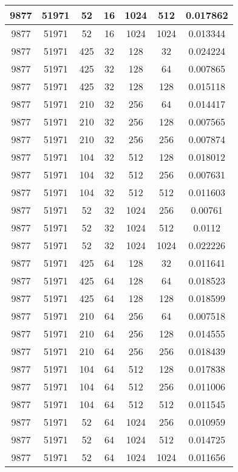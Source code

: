 \documentclass[9pt]{article}
\begin{document}
\begin{tabular}{|c|c|c|c|c|c|c| }
\hline
9877  & 51971  & 52  & 16  & 1024  & 512  & 0.017862 \\
\hline
9877  & 51971  & 52  & 16  & 1024  & 1024  & 0.013344 \\
\hline
9877  & 51971  & 425  & 32  & 128  & 32  & 0.024224 \\
\hline
9877  & 51971  & 425  & 32  & 128  & 64  & 0.007865 \\
\hline
9877  & 51971  & 425  & 32  & 128  & 128  & 0.015118 \\
\hline
9877  & 51971  & 210  & 32  & 256  & 64  & 0.014417 \\
\hline
9877  & 51971  & 210  & 32  & 256  & 128  & 0.007565 \\
\hline
9877  & 51971  & 210  & 32  & 256  & 256  & 0.007874 \\
\hline
9877  & 51971  & 104  & 32  & 512  & 128  & 0.018012 \\
\hline
9877  & 51971  & 104  & 32  & 512  & 256  & 0.007631 \\
\hline
9877  & 51971  & 104  & 32  & 512  & 512  & 0.011603 \\
\hline
9877  & 51971  & 52  & 32  & 1024  & 256  & 0.00761 \\
\hline
9877  & 51971  & 52  & 32  & 1024  & 512  & 0.0112 \\
\hline
9877  & 51971  & 52  & 32  & 1024  & 1024  & 0.022226 \\
\hline
9877  & 51971  & 425  & 64  & 128  & 32  & 0.011641 \\
\hline
9877  & 51971  & 425  & 64  & 128  & 64  & 0.018523 \\
\hline
9877  & 51971  & 425  & 64  & 128  & 128  & 0.018599 \\
\hline
9877  & 51971  & 210  & 64  & 256  & 64  & 0.007518 \\
\hline
9877  & 51971  & 210  & 64  & 256  & 128  & 0.014555 \\
\hline
9877  & 51971  & 210  & 64  & 256  & 256  & 0.018439 \\
\hline
9877  & 51971  & 104  & 64  & 512  & 128  & 0.017838 \\
\hline
9877  & 51971  & 104  & 64  & 512  & 256  & 0.011006 \\
\hline
9877  & 51971  & 104  & 64  & 512  & 512  & 0.011545 \\
\hline
9877  & 51971  & 52  & 64  & 1024  & 256  & 0.010959 \\
\hline
9877  & 51971  & 52  & 64  & 1024  & 512  & 0.014725 \\
\hline
9877  & 51971  & 52  & 64  & 1024  & 1024  & 0.011656 \\

\end{tabular}
\end{document}
